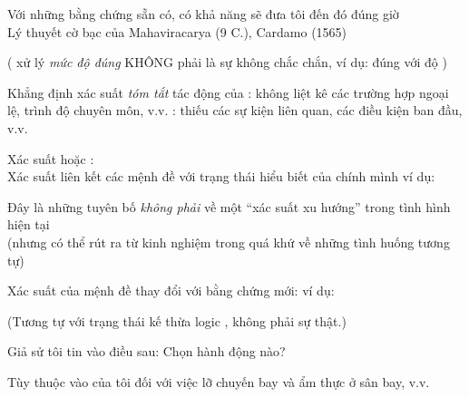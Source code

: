 \documentclass{article}
\begin{document}
\begin{huge}
\al
  Với những bằng chứng sẵn có,\nl
     có khả năng sẽ đưa tôi đến đó đúng giờ \\
Lý thuyết cờ bạc của Mahaviracarya (9 C.), Cardamo (1565)

( xử lý \emph{mức độ đúng} KHÔNG phải là sự không chắc chắn, ví dụ:\al
   đúng với độ )




Khẳng định xác suất \emph{tóm tắt} tác động của \al
  : không liệt kê các trường hợp ngoại lệ, trình độ chuyên môn, v.v.\al
  : thiếu các sự kiện liên quan, các điều kiện ban đầu, v.v.

Xác suất  hoặc :\\
Xác suất liên kết các mệnh đề với trạng thái hiểu biết của chính mình\nl
ví dụ: 

Đây là những tuyên bố \emph{không phải} về một ``xác suất
xu hướng'' trong tình hình hiện tại\\
(nhưng có thể rút ra từ kinh nghiệm trong quá khứ về những tình huống tương tự)

Xác suất của mệnh đề thay đổi với bằng chứng mới:\nl
ví dụ: 

(Tương tự với trạng thái kế thừa logic , không phải sự thật.)




Giả sử tôi tin vào điều sau:
Chọn hành động nào?

Tùy thuộc vào  của tôi đối với việc lỡ chuyến bay và ẩm thực ở sân bay, v.v.


\end{huge}
\end{document}
